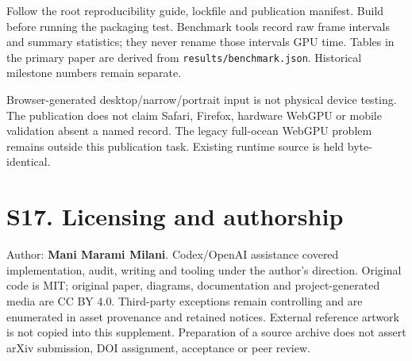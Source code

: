 \documentclass[
  english,
  11pt,
]{article}
\begin{document}
Follow the root reproducibility guide, lockfile and publication
manifest. Build before running the packaging test. Benchmark tools
record raw frame intervals and summary statistics; they never rename
those intervals GPU time. Tables in the primary paper are derived from
\texttt{results/benchmark.json}. Historical milestone numbers remain
separate.

Browser-generated desktop/narrow/portrait input is not physical device
testing. The publication does not claim Safari, Firefox, hardware WebGPU
or mobile validation absent a named record. The legacy full-ocean WebGPU
problem remains outside this publication task. Existing runtime source
is held byte-identical.

\section{S17. Licensing and
authorship}\label{s17.-licensing-and-authorship}

Author: \textbf{Mani Marami Milani}. Codex/OpenAI assistance covered
implementation, audit, writing and tooling under the author's direction.
Original code is MIT; original paper, diagrams, documentation and
project-generated media are CC BY 4.0. Third-party exceptions remain
controlling and are enumerated in asset provenance and retained notices.
External reference artwork is not copied into this supplement.
Preparation of a source archive does not assert arXiv submission, DOI
assignment, acceptance or peer review.
\end{document}
